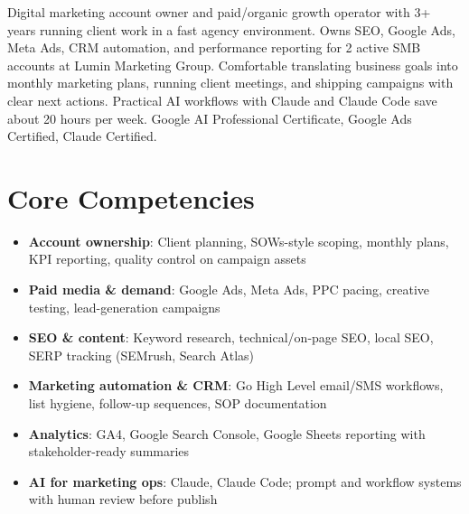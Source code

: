 \documentclass[11pt,a4paper,sans]{moderncv}
\begin{document}
\makecvtitle

\vspace{6pt}
\small{Digital marketing account owner and paid/organic growth operator with 3+ years running client work in a fast agency environment. Owns SEO, Google Ads, Meta Ads, CRM automation, and performance reporting for 2 active SMB accounts at Lumin Marketing Group. Comfortable translating business goals into monthly marketing plans, running client meetings, and shipping campaigns with clear next actions. Practical AI workflows with Claude and Claude Code save about 20 hours per week. Google AI Professional Certificate, Google Ads Certified, Claude Certified.}

\section{Core Competencies}
\vspace{1pt}
\begin{itemize}
\item \textbf{Account ownership}: Client planning, SOWs-style scoping, monthly plans, KPI reporting, quality control on campaign assets
\item \textbf{Paid media \& demand}: Google Ads, Meta Ads, PPC pacing, creative testing, lead-generation campaigns
\item \textbf{SEO \& content}: Keyword research, technical/on-page SEO, local SEO, SERP tracking (SEMrush, Search Atlas)
\item \textbf{Marketing automation \& CRM}: Go High Level email/SMS workflows, list hygiene, follow-up sequences, SOP documentation
\item \textbf{Analytics}: GA4, Google Search Console, Google Sheets reporting with stakeholder-ready summaries
\item \textbf{AI for marketing ops}: Claude, Claude Code; prompt and workflow systems with human review before publish
\end{itemize}
\end{document}
